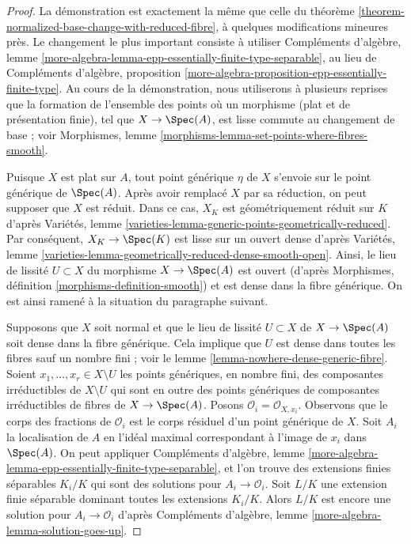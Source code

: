 \begin{proof}
La démonstration est exactement la même que celle du
théorème \ref{theorem-normalized-base-change-with-reduced-fibre},
à quelques modifications mineures près. Le changement le plus important
consiste à utiliser Compléments d'algèbre, lemme
\ref{more-algebra-lemma-epp-essentially-finite-type-separable},
au lieu de Compléments d'algèbre, proposition
\ref{more-algebra-proposition-epp-essentially-finite-type}.
Au cours de la démonstration, nous utiliserons à plusieurs reprises que la formation de l'ensemble des points
où un morphisme (plat et de présentation finie), tel que $X \to \Spec(A)$, est
lisse commute au changement de base ; voir
Morphismes, lemme \ref{morphisms-lemma-set-points-where-fibres-smooth}.

\medskip\noindent
Puisque $X$ est plat sur $A$, tout point générique $\eta$ de $X$ s'envoie sur le
point générique de $\Spec(A)$.
Après avoir remplacé $X$ par sa réduction, on peut supposer que $X$ est réduit.
Dans ce cas, $X_K$ est géométriquement réduit sur $K$
d'après Variétés, lemme \ref{varieties-lemma-generic-points-geometrically-reduced}.
Par conséquent, $X_K \to \Spec(K)$ est lisse sur un ouvert dense d'après
Variétés, lemme \ref{varieties-lemma-geometrically-reduced-dense-smooth-open}.
Ainsi, le lieu de lissité $U \subset X$ du morphisme $X \to \Spec(A)$
est ouvert (d'après Morphismes, définition \ref{morphisms-definition-smooth})
et est dense dans la fibre générique. On est ainsi ramené à la situation
du paragraphe suivant.

\medskip\noindent
Supposons que $X$ soit normal et que le lieu de lissité $U \subset X$ de $X \to \Spec(A)$
soit dense dans la fibre générique. Cela implique que $U$ est dense dans toutes les fibres sauf
un nombre fini ; voir le lemme \ref{lemma-nowhere-dense-generic-fibre}.
Soient $x_1, \ldots, x_r \in X \setminus U$ les points génériques, en nombre fini,
des composantes irréductibles de $X \setminus U$ qui sont en outre
des points génériques de composantes irréductibles de fibres de $X \to \Spec(A)$.
Posons $\mathcal{O}_i = \mathcal{O}_{X, x_i}$. Observons que le corps des fractions
de $\mathcal{O}_i$ est le corps résiduel d'un point générique de $X$.
Soit $A_i$ la localisation de $A$ en l'idéal maximal correspondant
à l'image de $x_i$ dans $\Spec(A)$. On peut appliquer Compléments d'algèbre, lemme
\ref{more-algebra-lemma-epp-essentially-finite-type-separable},
et l'on trouve des extensions finies séparables $K_i/K$ qui sont des
solutions pour $A_i \to \mathcal{O}_i$. Soit $L/K$ une extension finie
séparable dominant toutes les extensions $K_i/K$.
Alors $L/K$ est encore une solution pour $A_i \to \mathcal{O}_i$ d'après
Compléments d'algèbre, lemme \ref{more-algebra-lemma-solution-goes-up}.


\end{proof}
